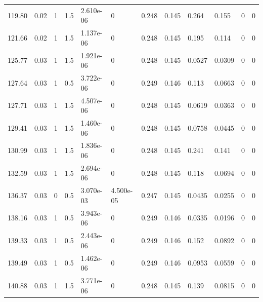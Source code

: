 \documentclass[preview]{standalone}
\begin{document}
{{\begin{tabular}{L{1.2cm}C{1.2cm} C{0.3cm}C{0.5cm} C{1.4cm}C{1.4cm} C{1.4cm}C{1.4cm} C{1.6cm}C{1.6cm} C{1.6cm}C{1.6cm}}
  119.80  &  0.02  & 1     & 1.5 &  2.610e-06  & 0  &  0.248&   0.145& 0.264 & 0.155   &  0 & 0  \\ 
  121.66  &  0.02  & 1     & 1.5 &  1.137e-06  & 0  &  0.248&   0.145& 0.195 & 0.114   &  0 & 0  \\ 
  125.77  &  0.03  & 1     & 1.5 &  1.921e-06  & 0  &  0.248&   0.145& 0.0527 & 0.0309   &  0 & 0  \\ 
  127.64  &  0.03  & 1     & 0.5 &  3.722e-06  & 0  &  0.249&   0.146& 0.113 & 0.0663   &  0 & 0  \\ 
  127.71  &  0.03  & 1     & 1.5 &  4.507e-06  & 0  &  0.248&   0.145& 0.0619 & 0.0363   &  0 & 0  \\ 
  129.41  &  0.03  & 1     & 1.5 &  1.460e-06  & 0  &  0.248&   0.145& 0.0758 & 0.0445   &  0 & 0  \\ 
  130.99  &  0.03  & 1     & 1.5 &  1.836e-06  & 0  &  0.248&   0.145& 0.241 & 0.141   &  0 & 0  \\ 
  132.59  &  0.03  & 1     & 1.5 &  2.694e-06  & 0  &  0.248&   0.145& 0.118 & 0.0694   &  0 & 0  \\ 
  136.37  &  0.03  & 0     & 0.5 &  3.070e-03  & 4.500e-05  &  0.247&   0.145& 0.0435 & 0.0255   &  0 & 0  \\ 
  138.16  &  0.03  & 1     & 0.5 &  3.943e-06  & 0  &  0.249&   0.146& 0.0335 & 0.0196   &  0 & 0  \\ 
  139.33  &  0.03  & 1     & 0.5 &  2.443e-06  & 0  &  0.249&   0.146& 0.152 & 0.0892   &  0 & 0  \\ 
  139.49  &  0.03  & 1     & 0.5 &  1.462e-06  & 0  &  0.249&   0.146& 0.0953 & 0.0559   &  0 & 0  \\ 
  140.88  &  0.03  & 1     & 1.5 &  3.771e-06  & 0  &  0.248&   0.145& 0.139 & 0.0815   &  0 & 0  \\ 
\hline 
\end{tabular} 

}}
\end{document}
